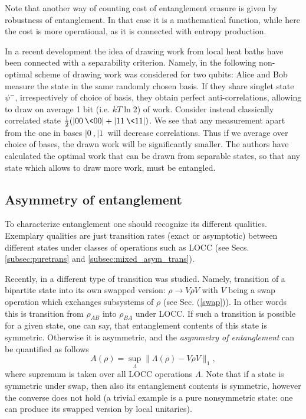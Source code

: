 \documentclass[twocolumn,aps,rmp]{revtex4}
\begin{document}
Note that another way of counting cost of entanglement erasure is
given by robustness of entanglement. In that case it is a mathematical
function, while here the cost is more operational, as it is connected
with entropy production.

In a recent development the idea of drawing work from local heat baths
have been connected with a separability criterion. Namely, in
\cite{MaruyamaMV2003-thermo-ent} the following non-optimal scheme of
drawing work was considered for two qubits: Alice and Bob measure the
state in the same randomly chosen basis. If they share singlet state
$\psi^-$, irrespectively of choice of basis, they obtain perfect
anti-correlations, allowing to draw on average 1 bit (i.e.  $kT \ln2$)
of work. Consider instead classically correlated state
$\frac{1}{2}(|00\>\<00|+|11\>\<11|)$. We see that any measurement apart from
the one in bases $|0\>,|1\>$ will decrease correlations. Thus if we
average over choice of bases, the drawn work will be significantly
smaller. The authors have calculated the optimal work that can be
drawn from separable states, so that any state which allows to draw
more work, must be entangled.



\subsection{Asymmetry of entanglement}
\label{sec:asym}

To characterize entanglement one should recognize its different
qualities. Exemplary qualities are just transition rates (exact or asymptotic) between different states under classes of operations such as LOCC  (see Secs. \ref{subsec:puretrans} and \ref{subsec:mixed_asym_trans}).

Recently, in \cite{HHHH-asymmetry} a different type of transition was
studied. Namely, transition of a bipartite state into its own swapped
version: $\rho \longrightarrow V\rho V$ with $V$ being a swap operation
which exchanges subsystems of $\rho$ (see Sec. (\ref{swap})). In other
words this is transition from $\rho_{AB}$ into
$\rho_{BA}$ under LOCC. If such a transition is possible for a given state, one
can say, that entanglement contents of this state is symmetric.
Otherwise it is asymmetric, and the {\it asymmetry of entanglement} can be quantified as follows
\begin{equation}
A(\rho)=\sup_\Lambda \|\Lambda(\rho) - V\rho V \|_1,
\end{equation}
where supremum is taken over all LOCC operations $\Lambda$.
Note that if a state is symmetric under swap, then also its entanglement
contents is symmetric, however the converse does not hold (a trivial example
is a pure nonsymmetric state: one can produce its swapped version by
local unitaries).
\end{document}
